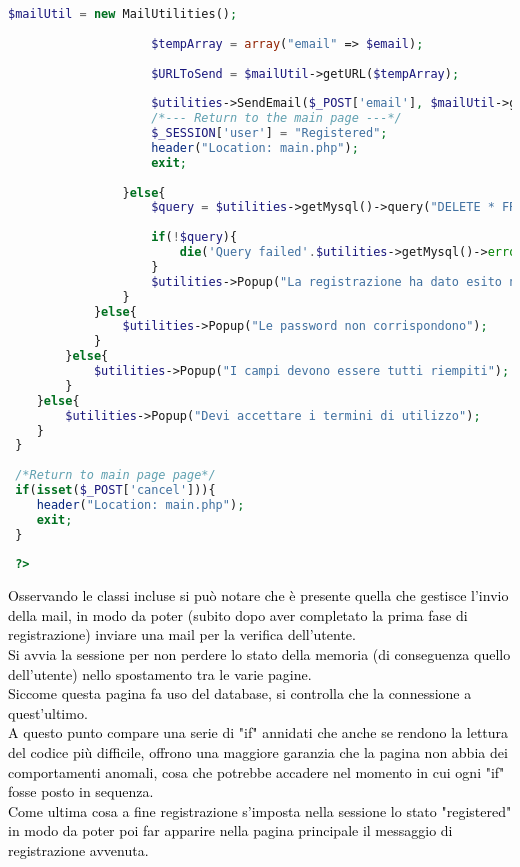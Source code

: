 \begin{lstlisting}[language=php]
 					$mailUtil = new MailUtilities();
 					
 					$tempArray = array("email" => $email);
 					
 					$URLToSend = $mailUtil->getURL($tempArray);
 					
 					$utilities->SendEmail($_POST['email'], $mailUtil->getSubject(), $mailUtil->getBody($URLToSend), $mailUtil->getAlternativeBody($URLToSend));
 					/*--- Return to the main page ---*/
 					$_SESSION['user'] = "Registered";
 					header("Location: main.php");
 					exit;
 					
 				}else{
 					$query = $utilities->getMysql()->query("DELETE * FROM usert_table1 WHERE (email = '{$email}')");
 					
 					if(!$query){
 						die('Query failed'.$utilities->getMysql()->error);
 					} 
					$utilities->Popup("La registrazione ha dato esito negativo");
 				}
 			}else{
 				$utilities->Popup("Le password non corrispondono");
 			}
 		}else{
 			$utilities->Popup("I campi devono essere tutti riempiti");
 		}
 	}else{
 		$utilities->Popup("Devi accettare i termini di utilizzo");
 	}
 }
 
 /*Return to main page page*/
 if(isset($_POST['cancel'])){
 	header("Location: main.php");
 	exit;
 }
 
 ?>
 \end{lstlisting}

 \textcolor{black}{Osservando le classi incluse si può notare che è presente quella che gestisce l'invio della mail, in modo da poter (subito dopo aver completato la prima fase di registrazione) inviare una mail per la verifica dell'utente.\\
 Si avvia la sessione per non perdere lo stato della memoria (di conseguenza quello dell'utente) nello spostamento tra le varie pagine.\\
 Siccome questa pagina fa uso del database, si controlla che la connessione a quest'ultimo.\\
 A questo punto compare una serie di "if" annidati che anche se rendono la lettura del codice più difficile, offrono una maggiore garanzia che la pagina non abbia dei comportamenti anomali, cosa che potrebbe accadere nel momento in cui ogni "if" fosse posto in sequenza.\\
 Come ultima cosa a fine registrazione s'imposta nella sessione lo stato "registered" in modo da poter poi far apparire nella pagina principale il messaggio di registrazione avvenuta.}\\
 
